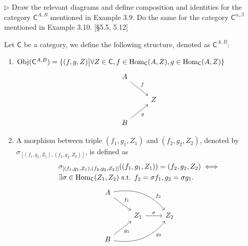 \begin{problem}[3.11]
  $\rhd$ Draw the relevant diagrams and define composition and identities for the
  category $\mathsf{C}^{A,B}$ mentioned in Example 3.9. Do the same for the category
  $\mathsf{C}^{\alpha,\beta}$ mentioned in Example 3.10. [\S5.5, 5.12]
\end{problem}

\begin{solution}
Let $\mathsf{C}$ be a category, we define the following structure, denoted as $\mathsf{C}^{A,B}$:
\begin{enumerate}
\item $\mathrm{Obj}({\mathsf{C}^{A,B}})=\{(f,g, Z)\big{|} 
\forall Z\in \mathsf{C}, f\in \mathrm{Hom}_{\mathsf{C}}(A, Z), g\in \mathrm{Hom}_{\mathsf{C}}(A, Z)\}$
%
\[\begin{tikzcd}
A \arrow[dr, "f"] & \\
& Z \\
B \arrow[ur, "g"'] &
\end{tikzcd}
\]
%

\item A morphism between triple $(f_1, g_1, Z_1)$ and $(f_2, g_2, Z_2)$, denoted by 
$\sigma_{[(f_1,g_1,Z_1),(f_2,g_2,Z_2)]}$, 
is defined as
\begin{equation*}
\begin{split}
&\sigma_{[(f_1,g_1,Z_1),(f_2,g_2,Z_2)]}((f_1,g_1,Z_1)) = (f_2,g_2,Z_2) \iff \\
&\exists \sigma\in \mathrm{Hom}_{\mathsf{C}}(Z_1, Z_2) \text{ s.t. } f_2=\sigma f_1, g_2 = \sigma g_1.
\end{split}
\end{equation*}
%
\[
\begin{tikzcd}
A \arrow[dr, "f_1"] \arrow[drr, bend left, "f_2" near end] & \\
& Z_1 \arrow[r, "\sigma"] & Z_2 \\
B \arrow[ur, "g_1"'] \arrow[urr, bend right, "g_2"' near end]&
\end{tikzcd}
\]
%


\end{enumerate}
\end{solution}
